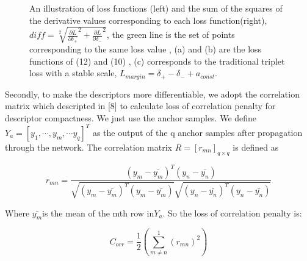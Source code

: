 \documentclass[letterpaper, 10 pt, conference]{ieeeconf}  %
\begin{document}
\begin{figure}[htbp]
\centering
{}%
\\
%
\\
%
\centering
\caption{An illustration of loss functions (left)  and the sum of the squares of the derivative values corresponding to each loss function(right), $diff = \sqrt[2]{\frac{\partial L}{\partial \delta _{+}}^{2} + \frac{\partial L}{\partial \delta _{-}}^{2}}$, the green line is the set of points corresponding to the same loss value , (a) and (b) are the loss functions of (12) and (10) , (c) corresponds to the traditional triplet loss with a stable scale, $L_{margin} = \delta _{+} - \delta _{-} + a_{const}.$ } 
\end{figure}
Secondly, to make the descriptors more differentiable, we adopt the correlation matrix which descripted in [8] to calculate loss of correlation penalty for descriptor compactness. We just use the anchor samples. We define $Y_{a} = \left [ y_{1},\cdots, y_{m},\cdots y_{q}\right ]^{T}$ as the output of the q anchor samples after propagation through the network. The correlation matrix  $R = \left [ r_{mn} \right ]_{q\times q}$ is defined as

\begin{small} 
\begin{equation} 
r_{mn} = \frac{(y_{m}-\bar{y_{m}})^{T}(y_{n}-\bar{y_{n}})}{\sqrt{(y_{m}-\bar{y_{m}})^{T}(y_{m}-\bar{y_{m}})}\sqrt{(y_{n}-\bar{y_{n}})^{T}(y_{n}-\bar{y_{n}})}} \tag{12}
\end{equation} 
\end{small}

Where $\bar{y_{m}}$is the mean of the mth row in$Y_{a}$. So the loss of correlation penalty is:

\begin{small} 
\begin{equation} 
C_{orr} = \frac{1}{2}\left ( \sum_{m\neq n}^{1} (r_{mn})^{2} \right ) \tag{13}
\end{equation} 
\end{small}
\end{document}
